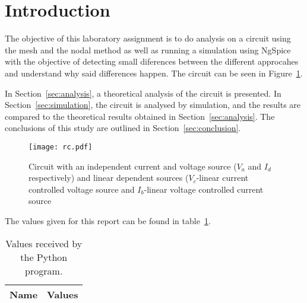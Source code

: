 \newpage
\section{Introduction}
\label{sec:introduction}


The objective of this laboratory assignment is to do analysis on a circuit using the mesh and the nodal method as well as running a simulation using NgSpice with the objective of detecting small diferences between the different approcahes and understand why said differences happen. The circuit can be seen in Figure~\ref{fig:rc}.

In Section~\ref{sec:analysis}, a theoretical analysis of the circuit is
presented. In Section~\ref{sec:simulation}, the circuit is analysed by
simulation, and the results are compared to the theoretical results obtained in
Section~\ref{sec:analysis}. The conclusions of this study are outlined in
Section~\ref{sec:conclusion}.

\squeezeup
\begin{figure}[h!] \centering
\texttt{[image: rc.pdf]}
\squeezeup
\caption{Circuit with an independent current and voltage source ($V_a$ and $I_d$ respectively) and linear dependent sources ($V_c$-linear current controlled voltage source and $I_b$-linear voltage controlled current source}
\label{fig:rc}
\end{figure}

The values given for this report can be found in table~\ref{tab:op1}.

\begin{table}[hb]
  \centering
  \begin{tabular}{|l|r|}
    \hline    
    {\bf Name} & {\bf Values} \\ \hline
    
  \end{tabular}
  \caption{Values received by the Python program.}
  \label{tab:op1}
\end{table}


